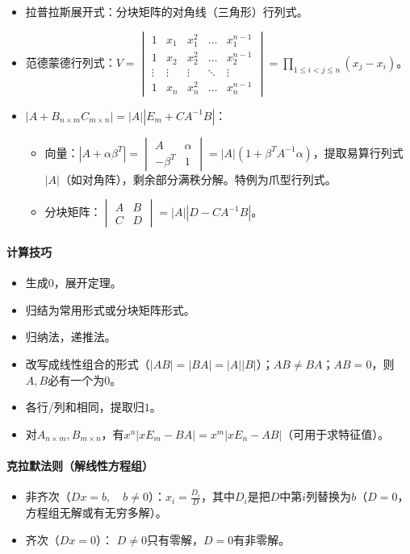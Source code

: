 \documentclass[
12pt, %
a4paper, 
oneside, %
]{scrartcl}
\begin{document}
\begin{itemize}
{\begin{align*}
= (-1)^{\frac{n(n - 1)}{2}} a_{1 1} a_{2 2} \dots a_{n n}
\end{align*}
}
\item 拉普拉斯展开式：分块矩阵的对角线（三角形）行列式。
\item 范德蒙德行列式：$ V = \begin{vmatrix} 1 & x_1 & x_1^2 & \dots & x_1^{n - 1} \\ 1 & x_2 & x_2^2 & \dots & x_2^{n - 1} \\ \vdots & \vdots & \vdots & \ddots & \vdots \\ 1 & x_n & x_n^2 & \dots & x_n^{n - 1} \end{vmatrix} = \prod_{1 \leq i < j \leq n} (x_j - x_i) $。
\item $ |A + B_{n \times m} C_{m \times n}| = |A||E_m + C A^{-1} B| $：
\begin{itemize}
\item 向量：$ |A + \alpha \beta^T| = \begin{vmatrix} A & \alpha \\ -\beta^T & 1 \end{vmatrix} = |A|(1 + \beta^T A^{-1} \alpha) $，提取易算行列式$ |A| $（如对角阵），剩余部分满秩分解。特例为爪型行列式。
\item 分块矩阵：$ \begin{vmatrix} A & B \\ C & D \end{vmatrix} = |A||D - C A^{-1} B| $。
\end{itemize}
\end{itemize}
\paragraph{计算技巧}
\begin{itemize}
\item 生成$ 0 $，展开定理。
\item 归结为常用形式或分块矩阵形式。
\item 归纳法，递推法。
\item 改写成线性组合的形式（$ |AB| = |BA| = |A||B| $）；$ AB \neq BA $；$ AB = 0 $，则$ A,B $必有一个为$ 0 $。
\item 各行/列和相同，提取归$ 1 $。
\item 对$ A_{n \times m}, B_{m \times n} $，有$ x^n |x E_m - BA| = x^m |x E_n - AB| $（可用于求特征值）。
\end{itemize}
\paragraph{克拉默法则（解线性方程组）}
\begin{itemize}
\item 非齐次（$ Dx = b, \quad b \neq 0 $）：$ x_i = \frac{D_i}{D} $，其中$ D_i $是把$ D $中第$ i $列替换为$ b $（$ D = 0 $，方程组无解或有无穷多解）。
\item 齐次（$ Dx = 0 $）： $ D \neq 0 $只有零解，$ D = 0 $有非零解。
\end{itemize}
\end{document}
